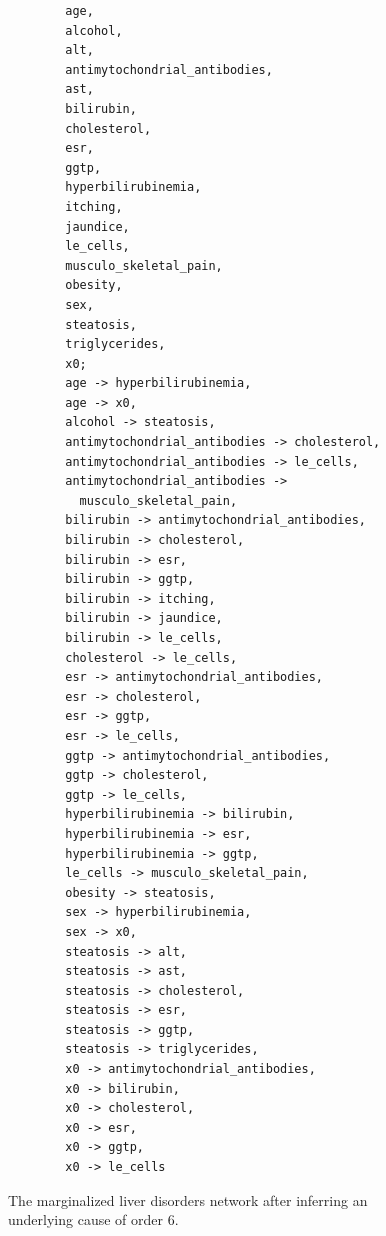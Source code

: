 \documentclass{article}
\begin{document}
	\begin{figure}
	\begin{verbatim}
		age,
		alcohol,
		alt,
		antimytochondrial_antibodies,
		ast,
		bilirubin,
		cholesterol,
		esr,
		ggtp,
		hyperbilirubinemia,
		itching,
		jaundice,
		le_cells,
		musculo_skeletal_pain,
		obesity,
		sex,
		steatosis,
		triglycerides,
		x0;
		age -> hyperbilirubinemia,
		age -> x0,
		alcohol -> steatosis,
		antimytochondrial_antibodies -> cholesterol,
		antimytochondrial_antibodies -> le_cells,
		antimytochondrial_antibodies ->
		  musculo_skeletal_pain,
		bilirubin -> antimytochondrial_antibodies,
		bilirubin -> cholesterol,
		bilirubin -> esr,
		bilirubin -> ggtp,
		bilirubin -> itching,
		bilirubin -> jaundice,
		bilirubin -> le_cells,
		cholesterol -> le_cells,
		esr -> antimytochondrial_antibodies,
		esr -> cholesterol,
		esr -> ggtp,
		esr -> le_cells,
		ggtp -> antimytochondrial_antibodies,
		ggtp -> cholesterol,
		ggtp -> le_cells,
		hyperbilirubinemia -> bilirubin,
		hyperbilirubinemia -> esr,
		hyperbilirubinemia -> ggtp,
		le_cells -> musculo_skeletal_pain,
		obesity -> steatosis,
		sex -> hyperbilirubinemia,
		sex -> x0,
		steatosis -> alt,
		steatosis -> ast,
		steatosis -> cholesterol,
		steatosis -> esr,
		steatosis -> ggtp,
		steatosis -> triglycerides,
		x0 -> antimytochondrial_antibodies,
		x0 -> bilirubin,
		x0 -> cholesterol,
		x0 -> esr,
		x0 -> ggtp,
		x0 -> le_cells
	\end{verbatim}
	\caption{The marginalized liver disorders network after inferring an underlying cause of order 6.}
	\label{inferred}
	\end{figure}
\end{document}
